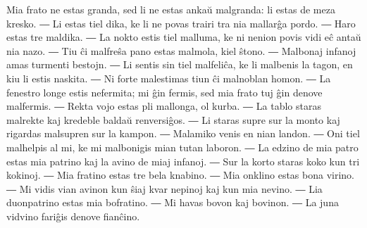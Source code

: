 Mia frato ne estas granda, sed li ne estas ankaŭ malgranda: li estas de meza kresko. ― Li estas tiel dika, ke li ne povas trairi tra nia mallarĝa pordo. ― Haro estas tre maldika. ― La nokto estis tiel malluma, ke ni nenion povis vidi eĉ antaŭ nia nazo. ― Tiu ĉi malfreŝa pano estas malmola, kiel ŝtono. ― Malbonaj infanoj amas turmenti bestojn. ― Li sentis sin tiel malfeliĉa, ke li malbenis la tagon, en kiu li estis naskita. ― Ni forte malestimas tiun ĉi malnoblan homon. ― La fenestro longe estis nefermita; mi ĝin fermis, sed mia frato tuj ĝin denove malfermis. ― Rekta vojo estas pli mallonga, ol kurba. ― La tablo staras malrekte kaj kredeble baldaŭ renversiĝos. ― Li staras supre sur la monto kaj rigardas malsupren sur la kampon. ― Malamiko venis en nian landon. ― Oni tiel malhelpis al mi, ke mi malbonigis mian tutan laboron. ― La edzino de mia patro estas mia patrino kaj la avino de miaj infanoj. ― Sur la korto staras koko kun tri kokinoj. ― Mia fratino estas tre bela knabino. ― Mia onklino estas bona virino. ― Mi vidis vian avinon kun ŝiaj kvar nepinoj kaj kun mia nevino. ― Lia duonpatrino estas mia bofratino. ― Mi havas bovon kaj bovinon. ― La juna vidvino fariĝis denove fianĉino.

